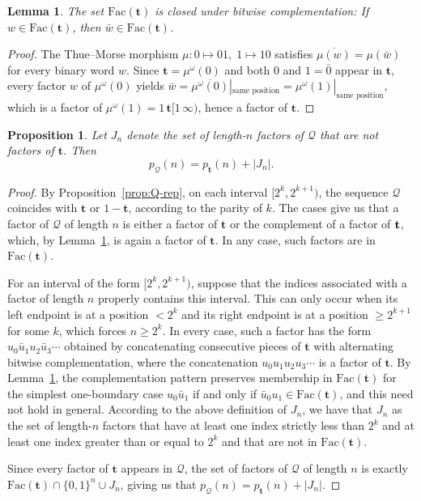 \documentclass[12pt,reqno]{article}
\theoremstyle{plain}
\newtheorem{lemma}[theorem]{Lemma}
\newtheorem{proposition}[theorem]{Proposition}
\theoremstyle{definition}
\theoremstyle{remark}
\begin{document}
\begin{lemma}\label{lem:tm-complement} 
 The set $\mathrm{Fac}(\mathbf{t})$ is closed under bitwise complementation: If $w \in \mathrm{Fac}(\mathbf{t})$, then 
 $\bar{w} \in \mathrm{Fac}(\mathbf{t})$.
\end{lemma}

\begin{proof}
 The Thue--Morse morphism $\mu: 0 \mapsto 01,\; 1 \mapsto 10$ satisfies $\overline{\mu(w)} = \mu(\bar{w})$ for every binary word 
 $w$. Since $\mathbf{t} = \mu^\omega(0)$ and both $0$ and $1 = \bar{0}$ appear in $\mathbf{t}$, every 
 factor $w$ of $\mu^\omega(0)$ yields $\bar{w} = \overline{\mu^\omega(0)}|_{\text{same position}} = 
 \mu^\omega(1)|_{\text{same position}}$, which is a factor of $\mu^\omega(1) = 1\, 
 \mathbf{t}[1\,\infty)$, hence a factor of $\mathbf{t}$.
\end{proof}

\begin{proposition}\label{prop:Q-exact} 
 Let $J_n$ denote the set of length-$n$ factors of $\mathcal{Q}$ that are not factors of $\mathbf{t}$. Then $$
 p_{\mathcal{Q}}(n) = p_{\mathbf{t}}(n) + |J_n|. $$
\end{proposition}

\begin{proof}
 By Proposition~\ref{prop:Q-rep}, on each interval $[2^k, 2^{k+1})$, the sequence $\mathcal{Q}$ coincides with $\mathbf{t}$ or 
 $1-\mathbf{t}$, according to the parity of $k$. The cases give us that a factor of $\mathcal{Q}$ of length $n$ is either a factor of 
 $\mathbf{t}$ or the complement of a factor of $\text{{\bf t}}$, which, by Lemma~\ref{lem:tm-complement}, is again a factor of 
 $\mathbf{t}$. In any case, such factors are in $\mathrm{Fac}(\mathbf{t})$.

 For an interval of the form $[2^k, 2^{k+1})$, suppose that the indices associated with a factor of length $n$ properly contains this 
 interval. This can only occur when its left endpoint is at a position $<2^k$ and its right endpoint is at a position $\ge 2^{k+1}$ for some 
 $k$, which forces $n\ge 2^k$. In every case, such a factor has the form $u_0\bar{u}_1 u_2\bar{u}_3\cdots$ obtained by concatenating 
 consecutive pieces of $\mathbf{t}$ with alternating bitwise complementation, where the concatenation $u_0 u_1 u_2 u_3\cdots$ is a 
 factor of $\mathbf{t}$. By Lemma~\ref{lem:tm-complement}, the complementation pattern preserves membership in 
 $\mathrm{Fac}(\mathbf{t})$ for the simplest one-boundary case $u_0 \bar{u}_1$ if and only if $\bar{u}_0 u_1 \in 
 \mathrm{Fac}(\mathbf{t})$, and this need not hold in general. According to the above definition of $J_n$, we have that $J_n$ as 
 the set of length-$n$ factors that have at least one index strictly less than $ 2^k$ and at least one index greater than or equal to
 $2^{k}$ and that are not in $\mathrm{Fac}(\mathbf{t})$.

 Since every factor of $\mathbf{t}$ appears in $\mathcal{Q}$, the set of factors of $\mathcal{Q}$ of length $n$ is exactly 
 $\mathrm{Fac}(\mathbf{t})\cap\{0,1\}^n \cup J_n$, giving us that $p_{\mathcal{Q}}(n) = p_{\mathbf{t}}(n) + |J_n|$.
\end{proof}
\end{document}
